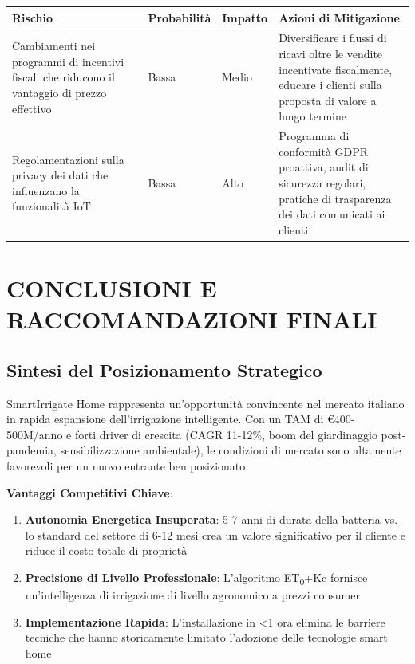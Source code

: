 \documentclass[11pt,a4paper]{report}
\begin{document}
\begin{longtable}{|p{3.5cm}|p{2cm}|p{2cm}|p{3.5cm}|}
\hline
\textbf{Rischio} & \textbf{Probabilità} & \textbf{Impatto} & \textbf{Azioni di Mitigazione} \\ \hline
Cambiamenti nei programmi di incentivi fiscali che riducono il vantaggio di prezzo effettivo & Bassa & Medio & Diversificare i flussi di ricavi oltre le vendite incentivate fiscalmente, educare i clienti sulla proposta di valore a lungo termine \\ \hline
Regolamentazioni sulla privacy dei dati che influenzano la funzionalità IoT & Bassa & Alto & Programma di conformità GDPR proattiva, audit di sicurezza regolari, pratiche di trasparenza dei dati comunicati ai clienti \\ \hline
\end{longtable}

\chapter{CONCLUSIONI E RACCOMANDAZIONI FINALI}

\section{Sintesi del Posizionamento Strategico}
SmartIrrigate Home rappresenta un'opportunità convincente nel mercato italiano in rapida espansione dell'irrigazione intelligente. Con un TAM di €400-500M/anno e forti driver di crescita (CAGR 11-12\%, boom del giardinaggio post-pandemia, sensibilizzazione ambientale), le condizioni di mercato sono altamente favorevoli per un nuovo entrante ben posizionato.

\textbf{Vantaggi Competitivi Chiave}:
\begin{enumerate}
    \item \textbf{Autonomia Energetica Insuperata}: 5-7 anni di durata della batteria vs. lo standard del settore di 6-12 mesi crea un valore significativo per il cliente e riduce il costo totale di proprietà
    \item \textbf{Precisione di Livello Professionale}: L'algoritmo ET\textsubscript{0}+Kc fornisce un'intelligenza di irrigazione di livello agronomico a prezzi consumer
    \item \textbf{Implementazione Rapida}: L'installazione in <1 ora elimina le barriere tecniche che hanno storicamente limitato l'adozione delle tecnologie smart home
\end{enumerate}
\end{document}
